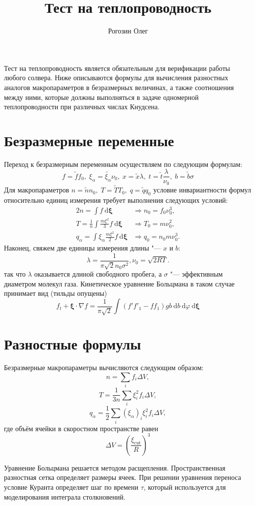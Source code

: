 \documentclass[a4paper,10pt]{article}
\title{Тест на теплопроводность}
\author{Рогозин Олег}
\date{}
\newcommand{\dd}{\:\mathrm{d}}
\begin{document}
\maketitle
Тест на теплопроводность является обязательным для верификации работы любого солвера.
Ниже описываются формулы для вычисления разностных аналогов макропараметров в безразмерных величинах,
а также соотношения между ними, которые должны выполняться в задаче одномерной теплопроводности при различных числах Кнудсена.

\section{Безразмерные переменные}
Переход к безразмерным переменным осуществляем по следующим формулам:
\[ f = \tilde{f}f_0,\; \xi_\alpha = \tilde{\xi_\alpha}\nu_0,\; x = \tilde{x}\lambda,\;
	t = \tilde{t}\frac{\lambda}{\nu_0},\; b = \tilde{b}\sigma\]
Для макропараметров \( n = \tilde{n}n_0, \; T = \tilde{T}T_0, \; q = \tilde{q}q_0\)
условие инвариантности формул относительно единиц измерения требует выполнения следующих условий:
\begin{alignat*}{2}
	n = \int f\dd\boldsymbol\xi &\Longrightarrow n_0 = f_0 \nu_0^3, \\
	T = \frac1{n}\int\frac{m\xi^2}{3}f\dd\boldsymbol\xi &\Longrightarrow T_0 = m\nu_0^2, \\
	q_\alpha = \int\xi_\alpha\frac{m\xi^2}{2}f\dd\boldsymbol\xi &\Longrightarrow q_0 = n_0m\nu_0^3.
\end{alignat*}
Наконец, свяжем две единицы измерения длины "--- \(x\) и \(b\):
\[ \lambda = \frac1{\pi\sqrt2 n_0 \sigma^2}, \nu_0 = \sqrt{2RT}.\]
так что \(\lambda\) оказывается длиной свободного пробега, а \(\sigma\) "--- эффективным диаметром молекул газа.
Кинетическое уравнение Больцмана в таком случае принимает вид (тильды опущены)
\[ f_t + \boldsymbol\xi\cdot\nabla f = \frac1{\pi\sqrt2}\int (f'f'_1-ff_1)gb\dd b \dd \varphi \dd\boldsymbol\xi \]
\section{Разностные формулы}
Безразмерные макропараметры вычисляются следующим образом:
\[ n = \sum_i f_i \Delta V, \]
\[ T = \frac1{3n}\sum_i \xi_i^2 f_i \Delta V, \]
\[ q_\alpha = \frac1{2}\sum_i \left(\xi_\alpha\right)_i\xi_i^2 f_i \Delta V, \]
где объём ячейки в скоростном пространстве равен
\[\Delta V = \left(\frac{\xi_\mathrm{cut}}{R}\right)^3\]

Уравнение Больцмана решается методом расщепления. Пространственная разностная сетка определяет размеры ячеек.
При решении уравнения переноса условие Куранта определяет шаг по времени \(\tau\),
который используется для моделирования интеграла столкновений.
\end{document}
